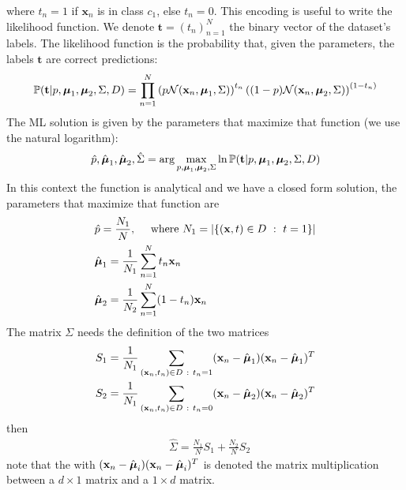 \documentclass[10pt, letterpaper]{report}
\begin{document}
where $t_n=1$ if $\mathbf x_n$ is in class $c_1$, else $t_n=0$. This encoding is useful to write the likelihood function. We denote $\mathbf t=(t_n)_{n=1}^N$ the binary vector of the dataset's labels. The likelihood function is the probability that, given the parameters, the labels $\mathbf t$ are correct predictions:
\begin{equation}
    {\mathbb P}(\mathbf t|p,{\boldsymbol{\mu}}_1,{\boldsymbol{\mu}}_2,\Sigma,D)=\prod_{n=1}^{N}
    \left(
    p\mathcal N(\mathbf x_n,{\boldsymbol{\mu}}_1,\Sigma)
    \right)^{t_n}
    \left(
    (1-p)\mathcal N(\mathbf x_n,{\boldsymbol{\mu}}_2,\Sigma)
    \right)^{(1-t_n)}
\end{equation}
The ML solution is given by the parameters that maximize that function (we use the natural logarithm):\begin{equation}
    \hat p,\hat{{\boldsymbol{\mu}}}_1,\hat{{\boldsymbol{\mu}}}_2,\hat\Sigma=\arg\max_{p,{\boldsymbol{\mu}}_1,{\boldsymbol{\mu}}_2,\Sigma}\ln{\mathbb P}(\mathbf t|p,{\boldsymbol{\mu}}_1,{\boldsymbol{\mu}}_2,\Sigma,D)
\end{equation}
In this context the function is analytical and we have a closed form solution, the parameters that maximize that function are\begin{align}
    &\hat p=\frac{N_1}{N}, \ \ \ \text{ where } N_1=|\{(\mathbf x,t)\in D \ : \ t=1\}|\\
    &\hat{{\boldsymbol{\mu}}}_1=\frac{1}{N_1}\sum_{n=1}^Nt_n\mathbf x_n\\
    &\hat{{\boldsymbol{\mu}}}_2=\frac{1}{N_2}\sum_{n=1}^N(1-t_n)\mathbf x_n\\
\end{align}
The matrix $\Sigma$ needs the definition of the two matrices\begin{align}
    &S_1=\frac{1}{N_1}\sum_{(\mathbf x_n,t_n)\in D \ : \ t_n=1}(\mathbf x_n-\hat \bmu_1)(\mathbf x_n-\hat \bmu_1)^T\\
    &S_2=\frac{1}{N_1}\sum_{(\mathbf x_n,t_n)\in D \ : \ t_n=0}(\mathbf x_n-\hat \bmu_2)(\mathbf x_n-\hat \bmu_2)^T
\end{align}
then\begin{align}
    &\hat \Sigma = \frac{N_1}{N}S_1+\frac{N_2}{N}S_2
\end{align}
note that the with $(\mathbf x_n-\hat {{\boldsymbol{\mu}}}_i)(\mathbf x_n-\hat {{\boldsymbol{\mu}}}_i)^T$ is denoted the matrix multiplication between a $d\times 1$ matrix and a $1\times d$ matrix.\bigskip
\end{document}
